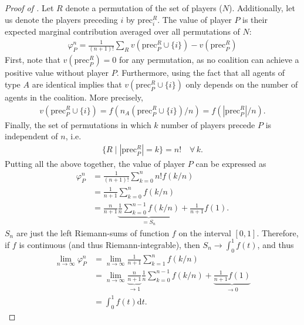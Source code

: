 \documentclass[a4paper]{article}
\newcommand{\dt}{\mathrm{d}t}
\newcommand{\precede}{\mathrm{prec}}
\begin{document}
\begin{proof}[Proof of ]
    Let $R$ denote a permutation of the set of players ($N$).
    Additionally, let us denote the players preceding $i$ by $\precede_i^R$.
    The value of player $P$ is their expected marginal contribution averaged over all permutations of $N$:
    \begin{align*}
        \varphi_P^n = \frac{1}{(n+1)!} \sum_R v(\precede_P^R \cup \{i\}) - v(\precede_P^R)
    \end{align*}
    First, note that $v(\precede_P^R) = 0$ for any permutation, as no coalition can achieve a positive value without player $P$.
    Furthermore, using the fact that all agents of type $A$ are identical implies that $v(\precede_P^R \cup \{i\})$ only depends on the number of agents in the coalition.
    More precisely, 
    \begin{align*}
        v(\precede_P^R \cup \{i\}) = f(n_A(\precede_P^R \cup \{i\}) / n) = f(|\precede_P^R| / n).
    \end{align*}
    Finally, the set of permutations in which $k$ number of players precede $P$ is independent of $n$, i.e.
    \begin{align*}
        \{R \mid |\precede_P^R| = k\} = n! \quad \forall\, k.
    \end{align*}
    Putting all the above together, the value of player $P$ can be expressed as
    \begin{align*}
        \varphi_P^n &= \frac{1}{(n+1)!} \sum_{k=0}^n n! f(k / n) \\
        &= \frac{1}{n+1} \sum_{k=0}^n f(k / n) \\
        &= \frac{n}{n+1} \underbrace{\frac{1}{n} \sum_{k=0}^{n-1} f(k / n)}_{=S_n} + \frac{1}{n+1} f(1).
    \end{align*}
    $S_n$ are just the left Riemann-sums of function $f$ on the interval $[0, 1]$.
    Therefore, if $f$ is continuous (and thus Riemann-integrable), then $S_n \to \int_0^1 f(t)$, and thus
    \begin{align*}
        \lim_{n \to \infty} \varphi_P^n &= \lim_{n \to \infty} \frac{1}{n+1} \sum_{k=1}^n f(k / n) \\
        &= \lim_{n \to \infty}\underbrace{\frac{n}{n+1}}_{\to 1} \frac{1}{n} \sum_{k=0}^{n-1} f(k / n) + \underbrace{\frac{1}{n+1} f(1)}_{\to 0} \\
        &= \int_0^1 f(t) \dt .
    \end{align*}
\end{proof}
\end{document}

